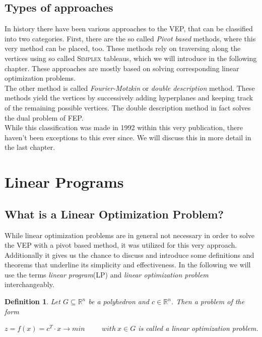 \documentclass[a4paper, 11pt]{article}
\makeatletter
\newtheorem{mydef}{Definition}
\renewenvironment{quotation}
{\list{}{\listparindent=1.5em
		\itemindent=0pt
		\parsep\z@ \@plus\p@}%
	\item\relax}
{\endlist}
\makeatother
\begin{document}
\subsection{Types of approaches}
In history there have been various approaches to the VEP, that can be classified into two categories. First, there are the so called \textit{Pivot based} methods, where this very method can be placed, too. These methods rely on traversing along the vertices using so called \textsc{Simplex} tableaus, which we will introduce in the following chapter. These approaches are mostly based on solving corresponding linear optimization problems.\\

The other method is called \textit{Fourier-Motzkin} or \textit{double description} method\cite{Motzkin}. These methods yield the vertices by successively adding hyperplanes and keeping track of the remaining possible vertices. The double description method in fact solves the dual problem of FEP. \\

While this classification was made in 1992 within this very publication, there haven't been exceptions to this ever since. We will discuss this in more detail in the last chapter.

\section{Linear Programs}
\subsection{What is a Linear Optimization Problem?}
While linear optimization problems are in general not necessary in order to solve the VEP with a pivot based method, it was utilized for this very approach. Additionally it gives us the chance to discuss and introduce some definitions and theorems that underline its simplicity and effectiveness. In the following we will use the terms \textit{linear program}(LP) and \textit{linear optimization problem} interchangeably.\\

\begin{mydef}
	Let $ G \subseteq \mathbb{R}^n$ be a polyhedron and $ c \in \mathbb{R}^n$. Then a problem of the form \\
	\vspace{0.15cm}
	\begin{quotation}
		$ z = f(x) = c^T \cdot x \rightarrow min\hspace{1cm} with\ x \in G$
	\end{quotation} 
	is called a \emph{linear} optimization problem.
\end{mydef}
\end{document}
